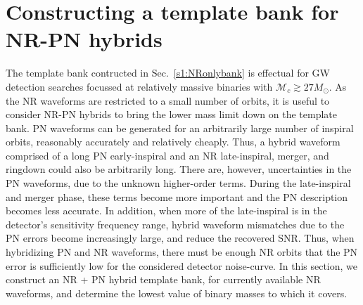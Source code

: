 \section{Constructing a template bank for NR-PN hybrids}\label{s1:NRpNhybridbank}

The template bank contructed in Sec.~\ref{s1:NRonlybank} is effectual for 
GW detection searches focussed at relatively massive binaries with 
$\mathcal{M}_c \gtrsim 27M_\odot$. As the NR waveforms are restricted to a
small number of orbits, it is useful to consider NR-PN hybrids to bring the
lower mass limit down on the template bank. PN waveforms can be generated
for an arbitrarily large number of inspiral orbits, reasonably accurately and
relatively cheaply. Thus, a hybrid waveform comprised of a long PN early-inspiral 
and an NR late-inspiral, merger, and ringdown could also be arbitrarily long. 
There are, however, uncertainties in the PN waveforms, due to
the unknown higher-order terms. During the late-inspiral and merger phase,
these terms become more important and the PN description becomes
less accurate. In addition, when more of the late-inspiral is
in the detector's sensitivity frequency range, hybrid waveform mismatches 
due to the PN errors become increasingly large, and reduce the
recovered SNR. Thus, when
hybridizing PN and NR waveforms, there must be enough NR orbits that the PN
error is sufficiently low for the considered detector noise-curve. In 
this section, we construct an NR + PN hybrid template bank, for currently
available NR waveforms, and determine the lowest value of binary masses to 
which it covers.



